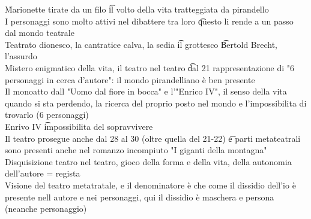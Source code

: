 \documentclass[12pt]{article}
\begin{document}
\v

Marionette tirate da un filo \t il volto della vita tratteggiata da pirandello \\
I personaggi sono molto attivi nel dibattere tra loro \t questo li rende a un passo dal mondo teatrale \\
Teatrato dionesco, la cantratice calva, la sedia \t il grottesco \t Bertold Brecht, l'assurdo \\
Mistero enigmatico della vita, il teatro nel teatro \t dal 21 rappresentazione di "6 personaggi in cerca d'autore": il mondo pirandelliano è ben presente \\
Il monoatto dall "Uomo dal fiore in bocca" e l'"Enrico IV", il senso della vita quando si sta perdendo, la ricerca del proprio posto nel mondo e l'impossibilita di trovarlo (6 personaggi) \\
Enrivo IV \t impossibilita del sopravvivere \\
Il teatro prosegue anche dal 28 al 30 (oltre quella del 21-22) \t e parti metateatrali sono presenti anche nel romanzo incompiuto "I giganti della montagna" \\
Disquisizione teatro nel teatro, gioco della forma e della vita, della autonomia dell'autore = regista \\
Visione del teatro metatratale, e il denominatore è che come il dissidio dell'io è presente nell autore e nei personaggi, qui il dissidio è maschera e persona (neanche personaggio)
\end{document}
